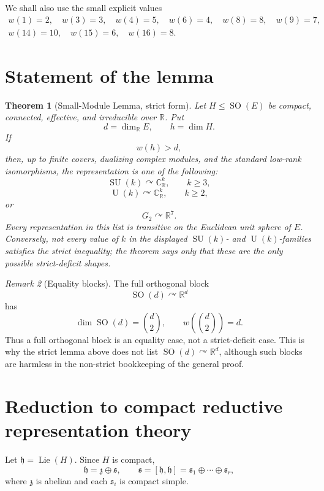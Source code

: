 \documentclass[11pt]{article}
\newtheorem{theorem}{Theorem}[section]
\theoremstyle{remark}
\newtheorem{remark}[theorem]{Remark}
\newcommand{\RR}{\mathbb{R}}
\newcommand{\CC}{\mathbb{C}}
\newcommand{\fh}{\mathfrak{h}}
\newcommand{\fs}{\mathfrak{s}}
\newcommand{\fz}{\mathfrak{z}}
\newcommand{\Lie}{\operatorname{Lie}}
\newcommand{\SU}{\operatorname{SU}}
\newcommand{\SO}{\operatorname{SO}}
\newcommand{\U}{\operatorname{U}}
\newcommand{\Gtwo}{G_2}
\begin{document}
We shall also use the small explicit values
\[
\begin{gathered}
  w(1)=2,
  \quad w(3)=3,
  \quad w(4)=5,
  \quad w(6)=4,
  \quad w(8)=8,
  \quad w(9)=7,\\
  w(14)=10,
  \quad w(15)=6,
  \quad w(16)=8.
\end{gathered}
\]

\section{Statement of the lemma}

\begin{theorem}[Small-Module Lemma, strict form]\label{thm:small-module}
Let \(H\leq \SO(E)\) be compact, connected, effective, and irreducible over \(\RR\).  Put
\[
  d=\dim_{\RR}E,
  \qquad
  h=\dim H.
\]
If
\[
  w(h)>d,
\]
then, up to finite covers, dualizing complex modules, and the standard low-rank isomorphisms, the representation is one of the following:
\[
  \SU(k)\curvearrowright \CC^k_{\RR},\qquad k\geq 3,
\]
\[
  \U(k)\curvearrowright \CC^k_{\RR},\qquad k\geq 2,
\]
or
\[
  \Gtwo\curvearrowright \RR^7.
\]
Every representation in this list is transitive on the Euclidean unit sphere of \(E\).  Conversely, not every value of \(k\) in the displayed \(\SU(k)\)- and \(\U(k)\)-families satisfies the strict inequality; the theorem says only that these are the only possible strict-deficit shapes.
\end{theorem}

\begin{remark}[Equality blocks]
The full orthogonal block
\[
  \SO(d)\curvearrowright \RR^d
\]
has
\[
  \dim \SO(d)=\binom d2,
  \qquad
  w\!\left(\binom d2\right)=d.
\]
Thus a full orthogonal block is an equality case, not a strict-deficit case.  This is why the strict lemma above does not list \(\SO(d)\curvearrowright\RR^d\), although such blocks are harmless in the non-strict bookkeeping of the general proof.
\end{remark}

\section{Reduction to compact reductive representation theory}

Let \(\fh=\Lie(H)\).  Since \(H\) is compact,
\[
  \fh=\fz\oplus \fs,
  \qquad
  \fs=[\fh,\fh]=\fs_1\oplus\cdots\oplus\fs_r,
\]
where \(\fz\) is abelian and each \(\fs_i\) is compact simple.
\end{document}
